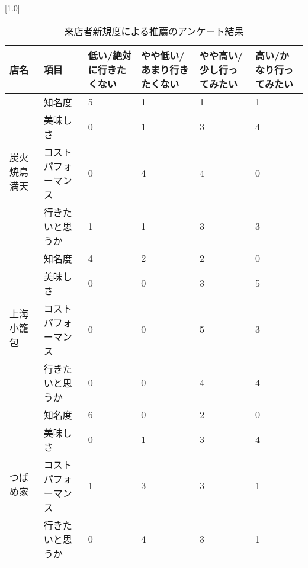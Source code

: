 \begin{table}[H]
\centering
\caption{来店者新規度による推薦のアンケート結果}
\label{table:questionnaire:addictivity}
\small
\scalebox{0.7}[1.0]{
\begin{tabular}{|l|l|l|l|l|l|}
\hline
店名 & 項目 & 低い/絶対に行きたくない & やや低い/あまり行きたくない & やや高い/少し行ってみたい & 高い/かなり行ってみたい \\ \hline
\multirow{4}{*}{炭火焼鳥 満天} & 知名度 & 5 & 1 & 1 & 1 \\ \cline{2-6}
 & 美味しさ & 0 & 1 & 3 & 4 \\ \cline{2-6}
 & コストパフォーマンス & 0 & 4 & 4 & 0 \\ \cline{2-6}
 & 行きたいと思うか & 1 & 1 & 3 & 3 \\ \hline
\multirow{4}{*}{上海小籠包} & 知名度 & 4 & 2 & 2 & 0 \\ \cline{2-6}
 & 美味しさ & 0 & 0 & 3 & 5 \\ \cline{2-6}
 & コストパフォーマンス & 0 & 0 & 5 & 3 \\ \cline{2-6}
 & 行きたいと思うか & 0 & 0 & 4 & 4 \\ \hline
\multirow{4}{*}{つばめ家} & 知名度 & 6 & 0 & 2 & 0 \\ \cline{2-6}
 & 美味しさ & 0 & 1 & 3 & 4 \\ \cline{2-6}
 & コストパフォーマンス & 1 & 3 & 3 & 1 \\ \cline{2-6}
 & 行きたいと思うか & 0 & 4 & 3 & 1 \\ \hline
\end{tabular}
}
\end{table}
